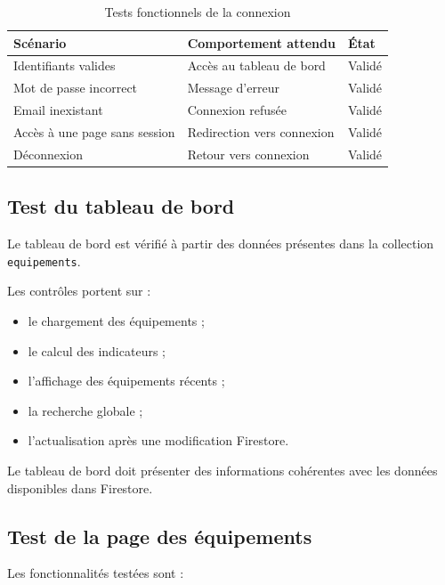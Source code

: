 \documentclass{rapportENSIAS}
\begin{document}
\begin{table}[htbp]
    \centering
    \caption{Tests fonctionnels de la connexion}
    \label{tab:tests-connexion}
    \begin{tabular}{|p{6cm}|p{4cm}|p{3cm}|}
        \hline
        \textbf{Scénario} & \textbf{Comportement attendu} & \textbf{État} \\
        \hline
        Identifiants valides & Accès au tableau de bord & Validé \\
        \hline
        Mot de passe incorrect & Message d’erreur & Validé \\
        \hline
        Email inexistant & Connexion refusée & Validé \\
        \hline
        Accès à une page sans session & Redirection vers connexion & Validé \\
        \hline
        Déconnexion & Retour vers connexion & Validé \\
        \hline
    \end{tabular}
\end{table}

\subsection{Test du tableau de bord}

Le tableau de bord est vérifié à partir des données présentes dans la collection \texttt{equipements}.

Les contrôles portent sur :

\begin{itemize}
    \item le chargement des équipements ;
    \item le calcul des indicateurs ;
    \item l’affichage des équipements récents ;
    \item la recherche globale ;
    \item l’actualisation après une modification Firestore.
\end{itemize}

Le tableau de bord doit présenter des informations cohérentes avec les données disponibles dans Firestore.

\subsection{Test de la page des équipements}

Les fonctionnalités testées sont :
\end{document}
